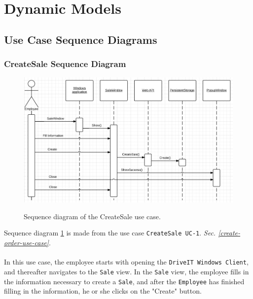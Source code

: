 \section{Dynamic Models}

\subsection{Use Case Sequence Diagrams}
\subsubsection{CreateSale Sequence Diagram}
\begin{figure}[H]
	\centering
		\includegraphics[width=\textwidth]{Figures/SequenceDiagram-CreateSale}\\
	\caption{Sequence diagram of the CreateSale use case.}
  \label{fig:SequenceDiagram-CreateSale}
\end{figure}

Sequence diagram \ref{fig:SequenceDiagram-CreateSale} is made from the use case \texttt{CreateSale UC-1}. \textit{Sec. \ref{create-order-use-case}}. \\\\
In this use case, the employee starts with opening the \texttt{DriveIT Windows Client}, and thereafter navigates to the \texttt{Sale} view. In the \texttt{Sale} view, the employee fills in the information necessary to create a \texttt{Sale}, and after the \texttt{Employee} has finished filling in the information, he or she clicks on the "Create" button.

